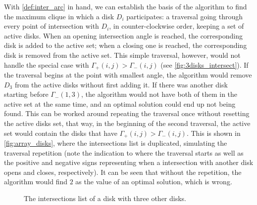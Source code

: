 With \autoref{def:inter_arc} in hand, we can establish the basis of the algorithm to find the maximum clique in which a disk $D_i$ participates: a traversal going through every point of intersection with $D_i$, in counter-clockwise order, keeping a set of active disks. When an opening intersection angle is reached, the corresponding disk is added to the active set; when a closing one is reached, the corresponding disk is removed from the active set.
This simple traversal, however, would not handle the special case with $\Gamma_+(i,j) > \Gamma_-(i,j)$ (see \autoref{fig:3disks_intersect}). If the traversal begins at the point with smallest angle, the algorithm would remove $D_3$ from the active disks without first adding it. If there was another disk starting before $\Gamma_-(1,3)$, the algorithm would not have both of them in the active set at the same time, and an optimal solution could end up not being found. This can be worked around repeating the traversal once without resetting the active disks set, that way, in the beginning of the second traversal, the active set would contain the disks that have $\Gamma_+(i,j) > \Gamma_-(i,j)$. This is shown in \autoref{fig:array_disks}, where the intersections list is duplicated, simulating the traversal repetition (note the indication to where the traversal starts as well as the positive and negative signs representing when a intersection with another disk opens and closes, respectively). It can be seen that without the repetition, the algorithm would find $2$ as the value of an optimal solution, which is wrong.

\begin{figure}[H]
    \centering
    
    \caption{The intersections list of a disk with three other disks.}
    
    \fautor
    \label{fig:array_disks}
\end{figure}

